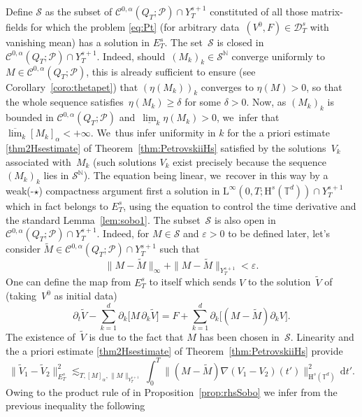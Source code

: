\documentclass[JEP,XML,SOM,Unicode,published]{cedram}
\theoremstyle{definition}
\newcommand\N{\mathbb{N}}
\newcommand\T{\mathbb{T}}
\newcommand\dd{\mathrm{d}}
\renewcommand\H{\mathrm{H}}
\renewcommand\L{\mathrm{L}}
\let\ep\varepsilon
\begin{document}
Define $\mathscr{S}$ as the subset of $\mathscr{C}^{0,\alpha}(Q_T;\mathscr{P})\cap Y_T^{s+1}$ constituted of all those matrix-fields for which the problem \eqref{eq:Pt} (for arbitrary data~$(V^0,F)\in\mathcal{D}^s_T$ with vanishing mean) has a solution in $E_T^s$. The set~$\mathscr{S}$ is closed in~$\mathscr{C}^{0,\alpha}(Q_T;\mathscr{P})\cap Y_T^{s+1}$. Indeed, should~$(M_k)_k\in\mathscr{S}^\N$ converge uniformly to $M\in\mathscr{C}^{0,\alpha}(Q_T;\mathscr{P})$, this is already sufficient to ensure (see Corollary~\ref{coro:thetapet}) that $(\eta(M_k))_k$ converges to $\eta(M)>0$, so that the whole sequence satisfies~$\eta(M_k)\geq \delta$ for some $\delta>0$. Now, as $(M_k)_k$ is bounded in $\mathscr{C}^{0,\alpha}(Q_T;\mathscr{P})$ and~$\underline{\lim}_k \eta(M_k)>0$, we~infer that~$\overline{\lim}_k [M_k]_\alpha<+\infty$. We~thus infer uniformity in $k$ for the a priori estimate \eqref{thm2Hsestimate} of Theorem~\ref{thm:PetrovskiiHs} satisfied by the solutions~$V_k$ associated with~$M_k$ (such solutions $V_k$ exist precisely because the sequence $(M_k)_k$ lies in $\mathscr{S}^\N$). The equation being linear, we~recover in this way by a weak(-$\star$) compactness argument first a solution in $\L^\infty(0,T;\H^s(\T^d))\cap Y_T^{s+1}$ which in fact belongs to $E_T^s$, using the equation to control the time derivative and the standard Lemma~\ref{lem:sobo1}. The subset~$\mathscr{S}$ is also open in~$\mathscr{C}^{0,\alpha}(Q_T;\mathscr{P})\cap Y_T^{s+1}$. Indeed, for $M\in\mathscr{S}$ and $\ep>0$ to be defined later, let's consider $\widetilde{M}\in\mathscr{C}^{0,\alpha}(Q_T;\mathscr{P})\cap Y_T^{s+1}$ such that
\[
\|M-\widetilde{M}\|_\infty +\|M-\widetilde{M}\|_{Y_T^{s+1}}< \ep.
\]
One can define the map from $E_T^s$ to itself which sends $V$ to the solution~$\widetilde{V}$ of (taking~$V^0$ as initial data)\vspace*{-3pt}
\[
\partial_t \widetilde{V}-\sum_{k=1}^d \partial_k \bigl[M\,\partial_k \widetilde{V}\bigr] = F+\sum_{k=1}^d \partial_k\bigl[(M-\widetilde{M})\partial_k V\bigr].
\]
The existence of~$\widetilde{V}$ is due to the fact that $M$ has been chosen in~$\mathscr{S}$. Linearity and the a priori estimate \eqref{thm2Hsestimate} of Theorem~\ref{thm:PetrovskiiHs} provide\vspace*{-3pt}
\[
\|\widetilde{V}_1-\widetilde{V}_{2}\|_{E_T^s}^2 \lesssim_{T,[M]_\alpha,\|M\|_{Y_T^{s+1}}} \int_0^T \|(M-\widetilde{M})\nabla (V_1-V_2)(t')\|_{\H^s(\T^d)}^2\,\dd t'.
\]
Owing to the product rule of in Proposition~\ref{prop:rhsSobo} we infer from the previous inequality the following\vspace*{-3pt}
\end{document}
